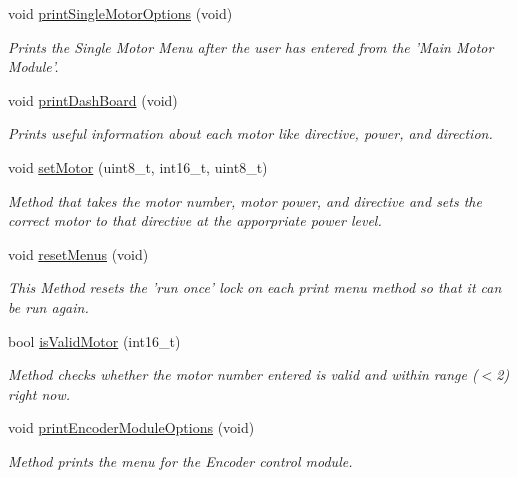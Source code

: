 \begin{DoxyCompactItemize}
void \hyperlink{classtask__user_a2866e8641ba983d7b819348a25774d47}{print\-Single\-Motor\-Options} (void)
\begin{DoxyCompactList}\small\item\em Prints the Single Motor Menu after the user has entered from the 'Main Motor Module'. \end{DoxyCompactList}\item 
void \hyperlink{classtask__user_affce6abe0cc4a021f490711a15234915}{print\-Dash\-Board} (void)
\begin{DoxyCompactList}\small\item\em Prints useful information about each motor like directive, power, and direction. \end{DoxyCompactList}\item 
void \hyperlink{classtask__user_ae247fa7d8dd68902ff4abf2c77b00fe2}{set\-Motor} (uint8\-\_\-t, int16\-\_\-t, uint8\-\_\-t)
\begin{DoxyCompactList}\small\item\em Method that takes the motor number, motor power, and directive and sets the correct motor to that directive at the apporpriate power level. \end{DoxyCompactList}\item 
void \hyperlink{classtask__user_a3ba42fcb41ae5292b75fe427ff26932c}{reset\-Menus} (void)
\begin{DoxyCompactList}\small\item\em This Method resets the 'run once' lock on each print menu method so that it can be run again. \end{DoxyCompactList}\item 
bool \hyperlink{classtask__user_a6178fb80b0e6fdebf254cc9aee6235a5}{is\-Valid\-Motor} (int16\-\_\-t)
\begin{DoxyCompactList}\small\item\em Method checks whether the motor number entered is valid and within range ($<$2) right now. \end{DoxyCompactList}\item 
void \hyperlink{classtask__user_a1a6e59f4124af9494daeb2f1639918d0}{print\-Encoder\-Module\-Options} (void)
\begin{DoxyCompactList}\small\item\em Method prints the menu for the Encoder control module. \end{DoxyCompactList}\end{DoxyCompactItemize}
